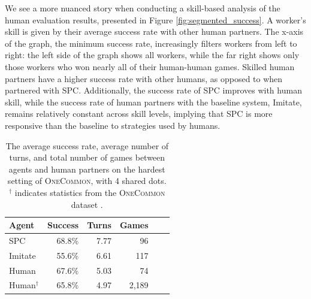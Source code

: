 \documentclass[11pt]{article}
\newcommand{\system}{SPC}
\begin{document}
We see a more nuanced story when conducting a skill-based analysis of the human evaluation results, presented in Figure \ref{fig:segmented_success}.
A worker's skill is given by their average success rate with other human partners.
The x-axis of the graph, the minimum success rate, increasingly filters workers from left to right:
the left side of the graph shows all workers, while the far right shows only those workers who won nearly all of their human-human games.
Skilled human partners have a higher success rate with other humans, as opposed to when partnered with \system{}.
Additionally, the success rate of \system{} improves with human skill, while the success rate of human partners with the baseline system, Imitate, remains relatively constant across skill levels, implying that \system{} is more responsive than the baseline to strategies used by humans.

\begin{table}[!t]
\centering
\begin{tabular}{lrrrrr}
\toprule
Agent                   & Success & Turns & Games\\
\midrule
\system{}               & 68.8\%  & 7.77 & 96\\
Imitate                 & 55.6\%  & 6.61 & 117\\
Human                   & 67.6\%  & 5.03 & 74\\
\hline
Human$^\dagger$         & 65.8\%  & 4.97 & 2,189\\
\bottomrule
\end{tabular}
\caption{\label{tbl:human-eval}
The average success rate, average number of turns, and total number of games between agents and human partners on the hardest setting of \textsc{OneCommon}, with 4 shared dots.
$^\dagger$ indicates statistics from the \textsc{OneCommon} dataset \citep{onecommon}.
\vspace{1em}
}
\end{table}
\end{document}
